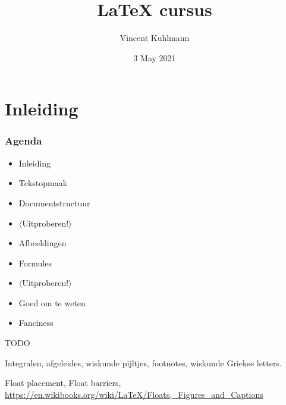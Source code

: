 

\title{\LaTeX{} cursus}
\author{Vincent Kuhlmann}
\date{3 May 2021}



\section{Inleiding}

\begin{frame}
	\titlepage
	\centering
\end{frame}


\begin{frame}
	\frametitle{Agenda}
	
	\begin{itemize}
		\item Inleiding
		\item Tekstopmaak
		\item Documentstructuur
		\item $ \langle $Uitproberen!$ \rangle $
		\item Afbeeldingen
		\item Formules
		\item $ \mathbf\langle $Uitproberen!$ \rangle $
		\item Goed om te weten
		\item Fanciness
	\end{itemize}
\end{frame}

\begin{frame}
	TODO
	
	Integralen, afgeleides, wiskunde pijltjes, footnotes, wiskunde Griekse letters.

	Float placement, Float barriers, \url{https://en.wikibooks.org/wiki/LaTeX/Floats,_Figures_and_Captions}
\end{frame}











